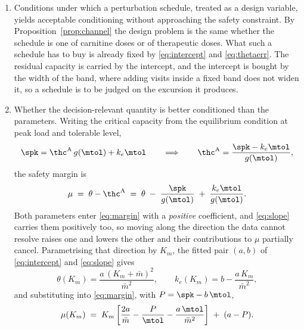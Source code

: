 \begin{enumerate}[leftmargin=*, itemsep=2pt]
\item Conditions under which a perturbation schedule, treated as a design variable,
      yields acceptable conditioning without approaching the safety constraint. By
      Proposition~\ref{prop:channel} the design problem is the same whether the schedule
      is one of carnitine doses or of therapeutic doses. What such a schedule has to buy is
      already fixed by \eqref{eq:intercept} and \eqref{eq:thetaerr}. The residual capacity
      is carried by the intercept, and the intercept is bought by the width of the band,
      where adding visits inside a fixed band does not widen it, so a schedule is to be
      judged on the excursion it produces.
\item Whether the decision-relevant quantity is better conditioned than the parameters.
      Writing the critical capacity from the equilibrium condition at peak load and
      tolerable level,
      \begin{equation}
      \spk = \thc^{\mathrm{A}}\, g(\mtol) + k_e \mtol
      \qquad \Longrightarrow \qquad
      \thc^{\mathrm{A}} = \frac{\spk - k_e \mtol}{g(\mtol)},
      \label{eq:thcrit}
      \end{equation}
      the safety margin is
      \begin{equation}
      \mu \;=\; \theta - \thc^{\mathrm{A}} \;=\; \theta \;-\; \frac{\spk}{g(\mtol)}
      \;+\; \frac{k_e \mtol}{g(\mtol)} .
      \label{eq:margin}
      \end{equation}
      Both parameters enter \eqref{eq:margin} with a \emph{positive} coefficient, and
      \eqref{eq:slope} carries them positively too, so moving along the direction the data
      cannot resolve raises one and lowers the other and their contributions to $\mu$
      partially cancel. Parametrising that direction by $K_m$, the fitted pair $(a,b)$ of
      \eqref{eq:intercept} and \eqref{eq:slope} gives
      \begin{equation}
      \theta(K_m) = \frac{a\,(K_m + \bar m)^2}{\bar m^{2}},
      \qquad
      k_e(K_m) = b - \frac{a\,K_m}{\bar m^{2}},
      \label{eq:fibre}
      \end{equation}
      and substituting into \eqref{eq:margin}, with $P = \spk - b\,\mtol$,
      \begin{equation}
      \mu(K_m) \;=\; K_m\left[\frac{2a}{\bar m} - \frac{P}{\mtol}
      - \frac{a\,\mtol}{\bar m^{2}}\right] \;+\; (a - P).
      \label{eq:mufibre}
      \end{equation}

\end{enumerate}
